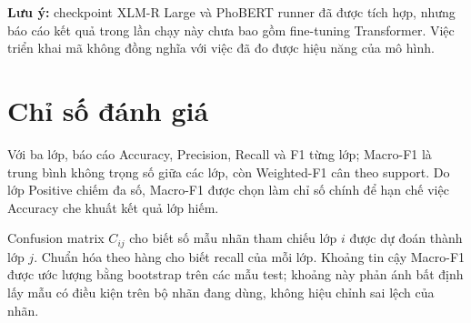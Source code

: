 \textbf{Lưu ý:} checkpoint XLM-R Large và PhoBERT runner đã được tích hợp, nhưng báo cáo kết quả trong lần chạy này chưa bao gồm fine-tuning Transformer. Việc triển khai mã không đồng nghĩa với việc đã đo được hiệu năng của mô hình.

\section{Chỉ số đánh giá}
Với ba lớp, báo cáo Accuracy, Precision, Recall và F1 từng lớp; Macro-F1 là trung bình không trọng số giữa các lớp, còn Weighted-F1 cân theo support. Do lớp Positive chiếm đa số, Macro-F1 được chọn làm chỉ số chính để hạn chế việc Accuracy che khuất kết quả lớp hiếm.

Confusion matrix $C_{ij}$ cho biết số mẫu nhãn tham chiếu lớp $i$ được dự đoán thành lớp $j$. Chuẩn hóa theo hàng cho biết recall của mỗi lớp. Khoảng tin cậy Macro-F1 được ước lượng bằng bootstrap trên các mẫu test; khoảng này phản ánh bất định lấy mẫu có điều kiện trên bộ nhãn đang dùng, không hiệu chỉnh sai lệch của nhãn.
